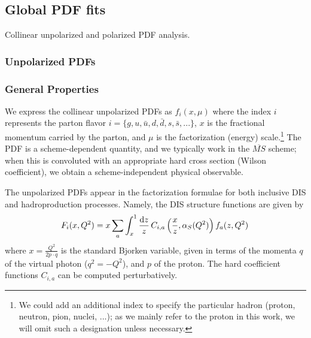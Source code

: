 \subsection{Global PDF fits}

Collinear unpolarized and polarized PDF analysis.

\subsubsection{Unpolarized PDFs}




\subsubsection*{General Properties}

We express the collinear unpolarized PDFs as $f_{i}(x,\mu)$
where the index $i$ represents the parton flavor $i=\{g,u,\bar{u},d,\bar{d},s,\bar{s},...\}$,
$x$ is the fractional momentum carried by the parton, and $\mu$
is the factorization (energy) scale.\footnote{We could add an additional index to specify the particular hadron
(proton, neutron, pion, nuclei, ...); as we mainly refer to the proton
in this work, we will omit such a designation unless necessary.} The PDF is a scheme-dependent quantity, and we typically work in
the $\overline{MS}$ scheme; when this is convoluted with an appropriate
hard cross section (Wilson coefficient), we obtain a scheme-independent
physical observable. 


The unpolarized PDFs appear in the factorization formulae for both inclusive DIS and hadroproduction processes. Namely, the DIS structure functions are given by
\begin{equation}
F_i(x,Q^2)=x\sum_a \int_x^1 \frac{{\rm d}z}{z}\,C_{i,a}\left(\frac{x}{z},\alpha_S(Q^2)\right)f_a(z,Q^2)\,
\end{equation}
where $x=\frac{Q^2}{2p\cdot q}$ is the standard Bjorken variable, given in terms of the momenta $q$ of the virtual photon ($q^2=-Q^2$), and $p$ of the proton. 
The hard coefficient functions $C_{i,a}$ can be computed perturbatively.

